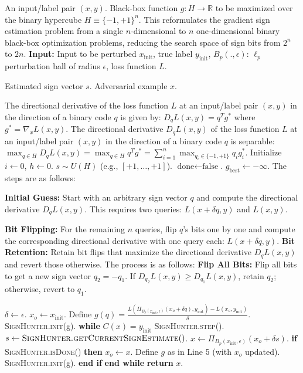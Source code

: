 An input/label pair $(x, y)$.
Black-box function $g: H \to \mathbb{R}$ to be maximized over the binary hypercube $H \equiv \{-1, +1\}^n$.
This reformulates the gradient sign estimation problem from a single $n$-dimensional to $n$ one-dimensional binary black-box optimization problems, reducing the search space of sign bits from $2^n$ to $2n$. 
\textbf{Input:} Input to be perturbed $x_{\text{init}}$, true label $y_{\text{init}}$, $B_p(., \epsilon)$: $\ell_p$ perturbation ball of radius $\epsilon$, loss function $L$.

Estimated sign vector $s$.
Adversarial example $x$.

The directional derivative of the loss function $L$ at an input/label pair $(x, y)$ in the direction of a binary code $q$ is given by:
$D_q L(x, y) = q^T g^*$
where $g^* = \nabla_x L(x, y)$.
The directional derivative $D_q L(x, y)$ of the loss function $L$ at an input/label pair $(x, y)$ in the direction of a binary code $q$ is separable:
$\max_{q \in H} D_q L(x, y) = \max_{q \in H} q^T g^* = \sum_{i=1}^n \max_{q_i \in \{-1, +1\}} q_i g^*_i.$
Initialize $i \leftarrow 0$, $h \leftarrow 0$.
$s \sim U(H)$ (e.g., $[+1, \ldots, +1]$).
$\text{done} \leftarrow \text{false}$.
$g_{\text{best}} \leftarrow -\infty$.
The steps are as follows:

\textbf{Initial Guess:} Start with an arbitrary sign vector $q$ and compute the directional derivative $D_q L(x, y)$. This requires two queries: $L(x + \delta q, y)$ and $L(x, y)$.

\textbf{Bit Flipping:} For the remaining $n$ queries, flip $q$'s bits one by one and compute the corresponding directional derivative with one query each: $L(x + \delta q, y)$.
\textbf{Bit Retention:} Retain bit flips that maximize the directional derivative $D_q L(x, y)$ and revert those otherwise.
The process is as follows:
\textbf{Flip All Bits:} Flip all bits to get a new sign vector $q_2 = -q_1$. If $D_{q_2} L(x, y) \geq D_{q_1} L(x, y)$, retain $q_2$; otherwise, revert to $q_1$.

$\delta \leftarrow \epsilon$.
$x_o \leftarrow x_{\text{init}}$.
Define $g(q) = \frac{L(\Pi_{B_p(x_{\text{init}}, \epsilon)} (x_o + \delta q), y_{\text{init}}) - L(x_o, y_{\text{init}})}{\delta}$.
\textsc{SignHunter.init}(g).
\textbf{while} $C(x) = y_{\text{init}}$
\textsc{SignHunter.step}().
$s \leftarrow \textsc{SignHunter.getCurrentSignEstimate}()$.
$x \leftarrow \Pi_{B_p(x_{\text{init}}, \epsilon)} (x_o + \delta s)$.
\textbf{if} \textsc{SignHunter.isDone()} \textbf{then}
$x_o \leftarrow x$.
Define $g$ as in Line 5 (with $x_o$ updated).
\textsc{SignHunter.init}(g).
\textbf{end if}
\textbf{end while}
\textbf{return} $x$.


